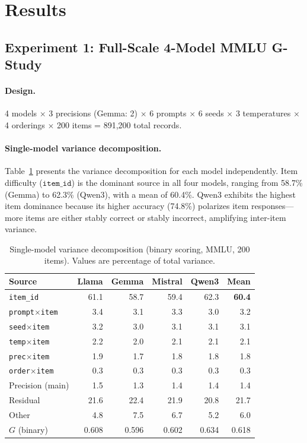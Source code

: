 \documentclass[letterpaper]{article}
\newcommand{\gcoeff}{\ensuremath{G}}
\newcommand{\pct}{\%}
\begin{document}
\section{Results}

\subsection{Experiment 1: Full-Scale 4-Model MMLU G-Study}

\paragraph{Design.}
4 models $\times$ 3 precisions (Gemma: 2) $\times$ 6 prompts $\times$ 6 seeds $\times$ 3 temperatures $\times$ 4 orderings $\times$ 200 items = 891,200 total records.

\paragraph{Single-model variance decomposition.}
Table~\ref{tab:single-model} presents the variance decomposition for each model independently.
Item difficulty ($\texttt{item\_id}$) is the dominant source in all four models, ranging from 58.7\pct{} (Gemma) to 62.3\pct{} (Qwen3), with a mean of 60.4\pct{}.
Qwen3 exhibits the highest item dominance because its higher accuracy (74.8\pct{}) polarizes item responses---more items are either stably correct or stably incorrect, amplifying inter-item variance.

\begin{table}[t]
\centering
\caption{Single-model variance decomposition (binary scoring, MMLU, 200 items). Values are percentage of total variance.}
\label{tab:single-model}
\small
\begin{tabular}{lrrrrr}
\toprule
Source & Llama & Gemma & Mistral & Qwen3 & Mean \\
\midrule
\texttt{item\_id}       & 61.1 & 58.7 & 59.4 & 62.3 & \textbf{60.4} \\
\texttt{prompt$\times$item}  & 3.4 & 3.1 & 3.3 & 3.0 & 3.2 \\
\texttt{seed$\times$item}   & 3.2 & 3.0 & 3.1 & 3.1 & 3.1 \\
\texttt{temp$\times$item}   & 2.2 & 2.0 & 2.1 & 2.1 & 2.1 \\
\texttt{prec$\times$item}   & 1.9 & 1.7 & 1.8 & 1.8 & 1.8 \\
\texttt{order$\times$item}  & 0.3 & 0.3 & 0.3 & 0.3 & 0.3 \\
Precision (main)             & 1.5 & 1.3 & 1.4 & 1.4 & 1.4 \\
Residual                     & 21.6 & 22.4 & 21.9 & 20.8 & 21.7 \\
Other                        & 4.8 & 7.5 & 6.7 & 5.2 & 6.0 \\
\midrule
$\gcoeff{}$ (binary)         & 0.608 & 0.596 & 0.602 & 0.634 & 0.618 \\
\bottomrule
\end{tabular}
\end{table}
\end{document}
